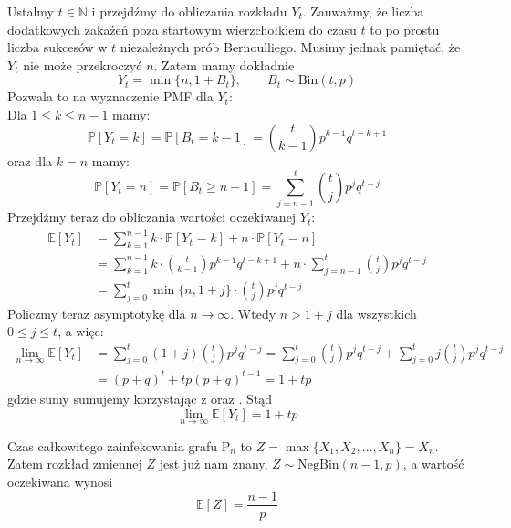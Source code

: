 Ustalmy $t\in\mathbb{N}$ i przejdźmy do obliczania rozkładu $Y_t$. Zauważmy, że liczba dodatkowych zakażeń poza startowym wierzchołkiem do czasu $t$ to po prostu liczba sukcesów w $t$ niezależnych prób Bernoulliego. Musimy jednak pamiętać, że $Y_t$ nie może przekroczyć $n$. Zatem mamy dokładnie
\[
Y_t = \min\{n, 1 + B_t\}, \quad \quad B_t \sim \mathrm{Bin}(t,p)
\]
Pozwala to na wyznaczenie PMF dla $Y_t$: \\
Dla $1 \le k \le n-1$ mamy:
\[
\mathbb{P}[Y_t=k] = \mathbb{P}[B_t=k-1] = \binom{t}{k-1} p^{k-1} q^{t-k+1}
\]  
oraz dla $k = n$ mamy:
\[
\mathbb{P}[Y_t=n] = \mathbb{P}[B_t \ge n-1] = \sum_{j=n-1}^{t} \binom{t}{j} p^j q^{t-j}
\]
Przejdźmy teraz do obliczania wartości oczekiwanej $Y_t$:
\begin{equation*}
\begin{aligned}
\mathbb{E}[Y_t] 
&= \sum_{k=1}^{n-1} k \cdot \mathbb{P}[Y_t=k] + n \cdot \mathbb{P}[Y_t=n] \\
&= \sum_{k=1}^{n-1} k \cdot \binom{t}{k-1} p^{k-1} q^{t-k+1} 
   + n \cdot \sum_{j=n-1}^{t} \binom{t}{j} p^j q^{t-j} \\
&= \sum_{j=0}^{t} \min\{n, 1+j\} \cdot \binom{t}{j} p^j q^{t-j}
\end{aligned}
\end{equation*}
Policzmy teraz asymptotykę dla $n \to \infty$. Wtedy $n > 1 + j$ dla wszystkich $0 \le j \le t$, a więc:
\begin{equation*}
\begin{aligned}
\lim_{n \to \infty} \mathbb{E}[Y_t] 
    &= \sum_{j=0}^{t} (1+j)\binom{t}{j} p^j q^{t-j} = \sum_{j=0}^{t} \binom{t}{j} p^j q^{t-j} 
       + \sum_{j=0}^{t} j \binom{t}{j} p^j q^{t-j} \\
    &= {(p+q)}^t + t p {(p+q)}^{t-1} = 1 + t p 
\end{aligned}
\end{equation*}
gdzie sumy sumujemy korzystając z  oraz . Stąd
\[
    \lim_{n \to \infty}\mathbb{E}[Y_t] = 1+tp
\]

Czas całkowitego zainfekowania grafu $\mathrm{P}_n$ to $Z = \max\{X_1,X_2,\dots,X_n\} = X_n$. Zatem rozkład zmiennej $Z$ jest już nam znany, $Z\sim\mathrm{NegBin}(n-1,p)$, a wartość oczekiwana wynosi 
\[
    \mathbb{E}[Z]=\frac{n-1}{p}
\]


